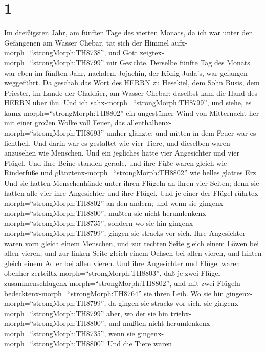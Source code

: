 \hypertarget{section}{%
\section{1}\label{section}}

 Im dreißigsten Jahr, am fünften Tage des vierten Monats, da
ich war unter den Gefangenen am Wasser Chebar, tat sich der Himmel
aufx-morph=``strongMorph:TH8738'', und Gott
zeigtex-morph=``strongMorph:TH8799'' mir Gesichte.  Derselbe
fünfte Tag des Monats war eben im fünften Jahr, nachdem Jojachin, der
König Juda's, war gefangen weggeführt.  Da geschah das Wort
des HERRN zu Hesekiel, dem Sohn Busis, dem Priester, im Lande der
Chaldäer, am Wasser Chebar; daselbst kam die Hand des HERRN über ihn.
 Und ich sahx-morph=``strongMorph:TH8799'', und siehe, es
kamx-morph=``strongMorph:TH8802'' ein ungestümer Wind von Mitternacht
her mit einer großen Wolke voll Feuer, das
allenthalbenx-morph=``strongMorph:TH8693'' umher glänzte; und mitten in
dem Feuer war es lichthell.  Und darin war es gestaltet wie
vier Tiere, und dieselben waren anzusehen wie Menschen.  Und
ein jegliches hatte vier Angesichter und vier Flügel.  Und
ihre Beine standen gerade, und ihre Füße waren gleich wie Rinderfüße und
glänztenx-morph=``strongMorph:TH8802'' wie helles glattes Erz.
 Und sie hatten Menschenhände unter ihren Flügeln an ihren
vier Seiten; denn sie hatten alle vier ihre Angesichter und ihre Flügel.
 Und je einer der Flügel
rührtex-morph=``strongMorph:TH8802'' an den andern; und wenn sie
gingenx-morph=``strongMorph:TH8800'', mußten sie nicht
herumlenkenx-morph=``strongMorph:TH8735'', sondern wo sie hin
gingenx-morph=``strongMorph:TH8799'', gingen sie stracks vor sich.
 Ihre Angesichter waren vorn gleich einem Menschen, und zur
rechten Seite gleich einem Löwen bei allen vieren, und zur linken Seite
gleich einem Ochsen bei allen vieren, und hinten gleich einem Adler bei
allen vieren.  Und ihre Angesichter und Flügel waren
obenher zerteiltx-morph=``strongMorph:TH8803'', daß je zwei Flügel
zusammenschlugenx-morph=``strongMorph:TH8802'', und mit zwei Flügeln
bedecktenx-morph=``strongMorph:TH8764'' sie ihren Leib.  Wo
sie hin gingenx-morph=``strongMorph:TH8799'', da gingen sie stracks vor
sich, sie gingenx-morph=``strongMorph:TH8799'' aber, wo der sie hin
triebx-morph=``strongMorph:TH8800'', und mußten nicht
herumlenkenx-morph=``strongMorph:TH8735'', wenn sie
gingenx-morph=``strongMorph:TH8800''.  Und die Tiere waren
